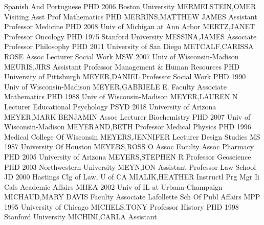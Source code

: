 \documentclass[
]{article}
\begin{document}
 \textbar Spanish And Portuguese \textbar PHD 2006 Boston
University \textbar MERMELSTEIN,OMER \textbar Visiting Asst Prof
\textbar{}  \textbar Mathematics \textbar PHD
\textbar MERRINS,MATTHEW JAMES \textbar Assistant Professor \textbar{}
 \textbar Medicine \textbar PHD 2008 Univ of Michigan at Ann
Arbor \textbar MERTZ,JANET \textbar Professor \textbar{} 
\textbar Oncology \textbar PHD 1975 Stanford University
\textbar MESSINA,JAMES \textbar Associate Professor \textbar{}
 \textbar Philosophy \textbar PHD 2011 University of San
Diego \textbar METCALF,CARISSA ROSE \textbar Assoc Lecturer \textbar{}
 \textbar Social Work \textbar MSW 2007 Univ of
Wisconsin-Madison \textbar MEURIS,JIRS \textbar Assistant Professor
\textbar{}  \textbar Management \& Human Resources
\textbar PHD University of Pittsburgh \textbar MEYER,DANIEL
\textbar Professor \textbar{}  \textbar Social Work
\textbar PHD 1990 Univ of Wisconsin-Madison \textbar MEYER,GABRIELE E.
\textbar Faculty Associate \textbar{}  \textbar Mathematics
\textbar PHD 1988 Univ of Wisconsin-Madison \textbar MEYER,LAUREN N
\textbar Lecturer \textbar{}  \textbar Educational
Psychology \textbar PSYD 2018 University of Arizona \textbar MEYER,MARK
BENJAMIN \textbar Assoc Lecturer \textbar{} 
\textbar Biochemistry \textbar PHD 2007 Univ of Wisconsin-Madison
\textbar MEYERAND,BETH \textbar Professor \textbar{} 
\textbar Medical Physics \textbar PHD 1996 Medical College Of Wisconsin
\textbar MEYERS,JENNIFER \textbar Lecturer \textbar{} 
\textbar Design Studies \textbar MS 1987 University Of Houston
\textbar MEYERS,ROSS O \textbar Assoc Faculty Assoc \textbar{}
 \textbar Pharmacy \textbar PHD 2005 University of Arizona
\textbar MEYERS,STEPHEN R \textbar Professor \textbar{} 
\textbar Geoscience \textbar PHD 2003 Northwestern University
\textbar MEYN,ION \textbar Assistant Professor \textbar{} 
\textbar Law School \textbar JD 2000 Hastings Clg of Law, U of CA
\textbar MIALIK,HEATHER \textbar Instructl Prg Mgr Ii \textbar{}
 \textbar Cals Academic Affairs \textbar MHEA 2002 Univ of
IL at Urbana-Champaign \textbar MICHAUD,MARY DAVIS \textbar Faculty
Associate \textbar{}  \textbar Lafollette Sch Of Publ
Affairs \textbar MPP 1995 University of Chicago \textbar MICHELS,TONY
\textbar Professor \textbar{}  \textbar History \textbar PHD
1998 Stanford University \textbar MICHINI,CARLA \textbar Assistant
\end{document}
